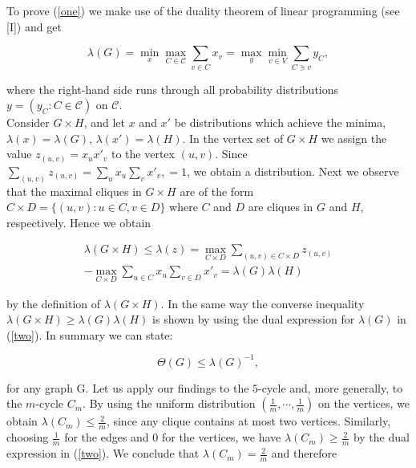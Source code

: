 \documentclass[openany,12pt]{memoir}
\newcommand{\setnewpagemargins}{
    \clearpage
    \setulmarginsandblock{2cm}{0.5cm}{*}
    \checkandfixthelayout
}
\begin{document}
To prove (\ref{one}) we make use of the duality theorem of linear programming 
(see [I]) and get

\begin{equation}
  \lambda(G) = \min_x\max_{C \in \mathcal{C}} \sum_{v\in C} x_v = \max_y\min_{v \in V}\sum_{C \ni v}y_C, \label{two}
\end{equation}

where the right-hand side runs through all probability distributions $y = (y_C : C \in \mathcal{C})$
on $\mathcal{C}$.\\
Consider $G \times H$, and let $x$ and $x'$ be distributions which achieve the 
minima, $\lambda(x) = \lambda(G)$, $\lambda(x') = \lambda(H)$. In the vertex set of $G \times H$ we 
assign the value $z_{(u,v)} = x_ux'_v$ to the vertex $(u, v)$. Since $\sum_{(u,v)}z_{(u,v)} = \sum_u x_u \sum_v x'_v, = 1$, 
we obtain a distribution. Next we observe that the maximal cliques in 
$G \times H$ are of the form $C \times D = \{(u, v) : u \in C, v \in D \} $
where $C$ and $D$ are cliques in $G$ and $H$, respectively. Hence we obtain 

\begin{equation*}
  \begin{align}
  \lambda(G \times H) \leq \lambda(z) = \max_{C \times D} \sum_{(u,v) \in C \times D} z_(u,v)\\
  - \max_{C \times D} \sum_{u\in C} x_u \sum_{v \in D} x'_v = \lambda(G)\lambda(H)
  \end{align}
\end{equation*}

\setnewpagemargins

by the definition of $\lambda(G \times H)$. In the same way the converse inequality 
$\lambda(G \times H) \geq \lambda(G)\lambda(H)$ is shown by using the dual expression for $\lambda(G)$ 
in (\ref{two}). In summary we can state: 

\begin{equation*}
  \Theta(G) \leq \lambda(G)^{-1},
\end{equation*}

for any graph G.
Let us apply our findings to the $5$-cycle and, more generally, to the $m$-cycle $C_m$.
By using the uniform distribution $(\frac{1}{m},\dotsb,\frac{1}{m})$ on the 
vertices, we obtain $\lambda(C_m) \leq \frac{2}{m} $, since any clique contains at most two 
vertices. Similarly, choosing $\frac{1}{m}$ for the edges and $0$ for the vertices, we have 
$\lambda(C_m) \geq \frac{2}{m}$ by the dual expression in (\ref{two}). We conclude that $\lambda(C_m) = \frac{2}{m}$ 
and therefore 
\end{document}
